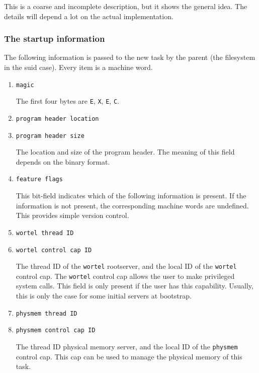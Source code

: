 This is a coarse and incomplete description, but it shows the general
idea.  The details will depend a lot on the actual implementation.


\subsubsection{The startup information}

The following information is passed to the new task by the parent (the
filesystem in the suid case).  Every item is a machine word.

\begin{enumerate}
\item \texttt{magic}
  
  The first four bytes are \texttt{E}, \texttt{X}, \texttt{E},
  \texttt{C}.

\item \texttt{program header location}
\item \texttt{program header size}
  
  The location and size of the program header.  The meaning of this
  field depends on the binary format.

\item \texttt{feature flags}
  
  This bit-field indicates which of the following information is
  present.  If the information is not present, the corresponding
  machine words are undefined.  This provides simple version control.

  \begin{comment}
    They could also be undefined.
  \end{comment}

\item \texttt{wortel thread ID}
\item \texttt{wortel control cap ID}
  
  The thread ID of the \texttt{wortel} rootserver, and the local ID of
  the \texttt{wortel} control cap.  The \texttt{wortel} control cap
  allows the user to make privileged system calls.  This field is only
  present if the user has this capability.  Usually, this is only the
  case for some initial servers at bootstrap.

\item \texttt{physmem thread ID}
\item \texttt{physmem control cap ID}
  
  The thread ID physical memory server, and the local ID of the
  \texttt{physmem} control cap.  This cap can be used to manage the
  physical memory of this task.


\end{enumerate}
